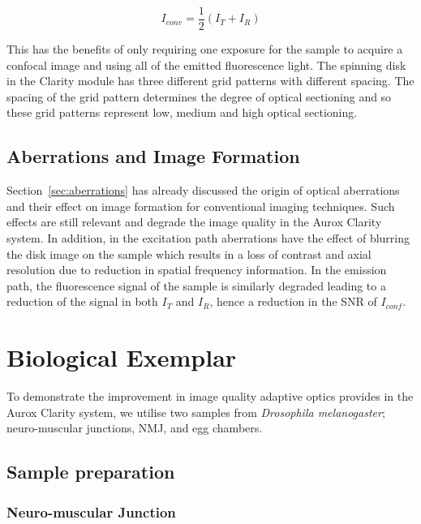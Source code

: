 \begin{equation}\label{eq:conventional_image}
I_{conv} = \frac{1}{2}\left(I_{T} + I_{R}\right)
\end{equation}

This has the benefits of only requiring one exposure for 
the sample to acquire a confocal image and using all of 
the emitted fluorescence light. The spinning disk in the 
Clarity module has three different grid patterns with 
different spacing. The spacing of the grid pattern determines
the degree of optical sectioning and so these grid patterns
represent low, medium and high optical sectioning\cite{neil1997method}.

\subsection{Aberrations and Image Formation}
\label{subsec:Aurox_aberrations}

Section~\ref{sec:aberrations} has already discussed the origin of 
optical aberrations and their effect on image formation for 
conventional imaging techniques. Such effects are still relevant
and degrade the image quality in the Aurox Clarity system. In addition,
in the excitation path aberrations have the effect of blurring the 
disk image on the sample which results in a loss of contrast and 
axial resolution due to reduction in spatial frequency
information\cite{wilson1990confocal, hell1993aberrations}. In the 
emission path, the fluorescence signal of the sample is similarly
degraded leading to a reduction of the signal in both $I_{T}$ and
$I_{R}$, hence a reduction in the SNR of $I_{conf}$. 

\section{Biological Exemplar}
\label{sec:Aurox_biology}

To demonstrate the improvement in image quality adaptive optics
provides in the Aurox Clarity system, we utilise two samples from
\textit{Drosophila melanogaster}; neuro-muscular junctions, NMJ, 
and egg chambers.

\subsection{Sample preparation}
\label{subsec:Aurox_sample_prep}

\subsubsection{Neuro-muscular Junction}
\label{subsubsec:Aurox_NMJ_prep}

